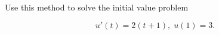 Use this method to solve the initial value problem

$$
u'(t) = 2(t + 1),\; u(1) = 3.
$$

\begin{solution}\ \\\\
    \ \\
\end{solution}